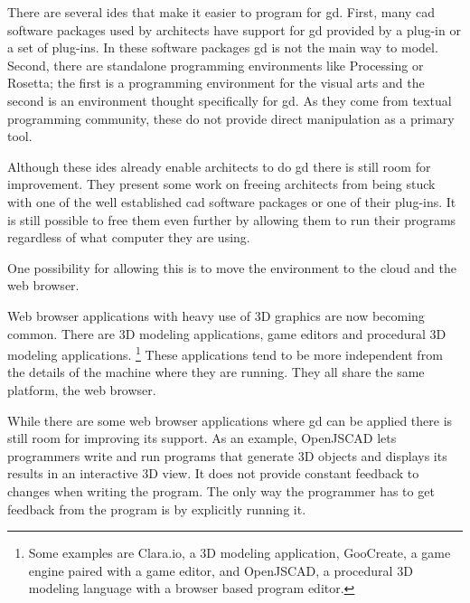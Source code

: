 \documentclass{./llncs2e/llncs}
\begin{document}
	There are several \ac{ide}s that make it easier to program for \ac{gd}. 
	First, many \ac{cad} software packages used by architects have support for \ac{gd} provided by a plug-in or a set of plug-ins.
	In these software packages \ac{gd} is not the main way to model.
	Second, there are standalone programming environments like Processing\cite{reas2007processing} or Rosetta\cite{de2012modern}; the first is a programming environment for the visual arts and the second is an environment thought specifically for \ac{gd}. 
	As they come from textual programming community, these do not provide direct manipulation as a primary tool.

	Although these \ac{ide}s already enable architects to do \ac{gd} there is still room for improvement.
	They present some work on freeing architects from being stuck with one of the well established \ac{cad} software packages or one of their plug-ins.
	It is still possible to free them even further by allowing them to run their programs regardless of what computer they are using.

	One possibility for allowing this is to move the environment to the cloud and the web browser.


	Web browser applications with heavy use of 3D graphics are now becoming common.
	There are 3D modeling applications, game editors and procedural 3D modeling applications.
	\footnote{Some examples are Clara.io\cite{houston2013clara}, a 3D modeling application, GooCreate\cite{goocreate2015site}, a game engine paired with a game editor, and OpenJSCAD\cite{openjscad2015site}, a procedural 3D modeling language with a browser based program editor.}
	These applications tend to be more independent from the details of the machine where they are running.
	They all share the same platform, the web browser.

	While there are some web browser applications where \ac{gd} can be applied there is still room for improving its support.
	As an example, OpenJSCAD lets programmers write and run programs that generate 3D objects and displays its results in an interactive 3D view.
	It does not provide constant feedback to changes when writing the program.
	The only way the programmer has to get feedback from the program is by explicitly running it.
\end{document}
